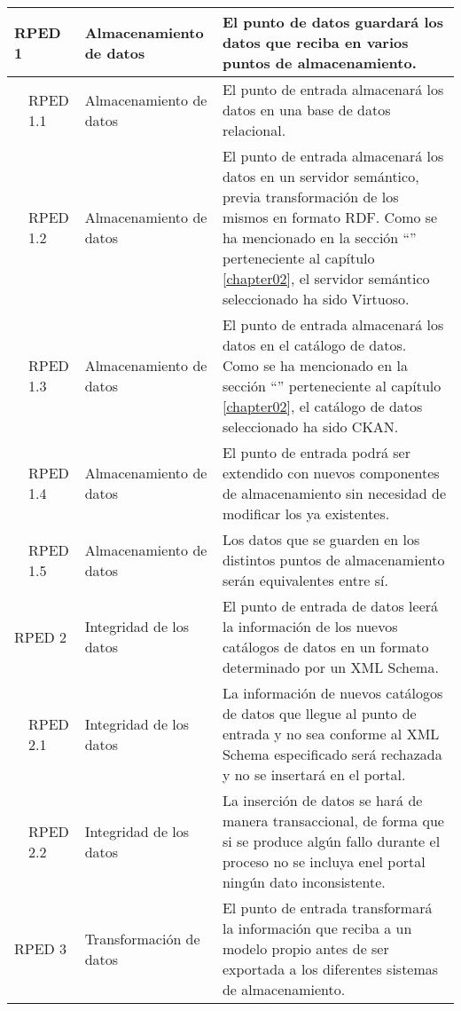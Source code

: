 \begin{longtable}[c]{|p{1mm}|p{14mm}|p{30mm}|p{90mm}|}
\multicolumn{2}{|l|}{RPED 1}  & Almacenamiento de datos & El punto de datos guardará los datos que reciba en varios puntos de almacenamiento. \\
\hline
& RPED 1.1 & Almacenamiento de datos & El punto de entrada almacenará los datos en una base de datos relacional. \\
\hline
& RPED 1.2 & Almacenamiento de datos & El punto de entrada almacenará los datos en un servidor semántico, previa transformación de los mismos en formato RDF.   Como se ha mencionado en la sección ``\nameref{chapter02:alternativas_seleccionadas}'' perteneciente al capítulo \ref{chapter02}, el servidor semántico seleccionado ha sido Virtuoso.\\
\hline
& RPED 1.3 & Almacenamiento de datos & El punto de entrada almacenará los datos en el catálogo de datos.  Como se ha mencionado en la sección ``\nameref{chapter02:alternativas_seleccionadas}'' perteneciente al capítulo \ref{chapter02}, el catálogo de datos seleccionado ha sido CKAN. \\
\hline
& RPED 1.4 & Almacenamiento de datos & El punto de entrada podrá ser extendido con nuevos componentes de almacenamiento sin necesidad de modificar los ya existentes. \\
\hline
& RPED 1.5 & Almacenamiento de datos & Los datos que se guarden en los distintos puntos de almacenamiento serán equivalentes entre sí. \\
\hline
\multicolumn{2}{|l|}{RPED 2}  & Integridad de los datos & El punto de entrada de datos leerá la información de los nuevos catálogos de datos en un formato determinado por un XML Schema. \\
\hline
& RPED 2.1 & Integridad de los datos & La información de nuevos catálogos de datos que llegue al punto de entrada y no sea conforme al XML Schema especificado será rechazada y no se insertará en el portal. \\
\hline
& RPED 2.2 & Integridad de los datos & La inserción de datos se hará de manera transaccional, de forma que si se produce algún fallo durante el proceso no se incluya enel portal ningún dato inconsistente. \\
\hline
\multicolumn{2}{|l|}{RPED 3}  & Transformación de datos & El punto de entrada transformará la información que reciba a un modelo propio antes de ser exportada a los diferentes sistemas de almacenamiento. \\
\hline
\hline

 \end{longtable}
 
 
 
 
 
 
 
 
 
 
 
 
 
 
 
 
 
 
 
 
 